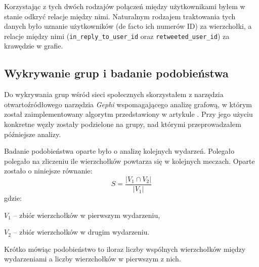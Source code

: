 Korzystając z tych dwóch rodzajów połączeń między użytkownikami byłem w stanie 
odkryć relacje między nimi. Naturalnym rodzajem traktowania tych danych było
uznanie użytkowników (de facto ich numerów ID) za wierzchołki, a relacje między nimi
(\texttt{in\_reply\_to\_user\_id} oraz \texttt{retweeted\_user\_id}) za krawędzie
w grafie.

 \subsection{Wykrywanie grup i badanie podobieństwa}
 \label{section:koncepcja-wykrywaniegrup}
Do wykrywania grup wśród sieci społecznych skorzystałem z narzędzia
otwartoźródłowego narzędzia \textit{Gephi} wspomagającego analizę grafową, w
którym został zaimplementowany algorytm przedstawiony w artykule
\cite{blondel2008fuc}. Przy jego użyciu konkretne węzły zostały podzielone
na grupy, nad którymi przeprowadzałem późniejsze analizy.



Badanie podobieństwa oparte było o analizę kolejnych wydarzeń. 
Polegało polegało na zliczeniu ile wierzchołków powtarza się w kolejnych meczach.
Oparte zostało o niniejsze równanie:
\begin{equation}
S = \frac{|V_1 \cap V_2|}{|V_1|}
\end{equation}  
gdzie:

$V_1$ -- zbiór wierzchołków w pierwszym wydarzeniu,

$V_2$ -- zbiór wierzchołków w drugim wydarzeniu.

Krótko mówiąc podobieństwo to iloraz liczby wspólnych wierzchołków między 
wydarzeniami a liczby wierzchołków w pierwszym z nich.


